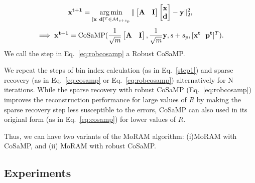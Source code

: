 $$
\mathbf{{x}^{t+1}}=\argmin_{[\mathbf{x~d}]^T \in \mathcal{M}_{s+s_p}}\norm{\begin{bmatrix} \mathbf{A} & \mathbf{I} \end{bmatrix} \begin{bmatrix} \mathbf{x} \\ \mathbf{d} \end{bmatrix} - \mathbf{y}}_2^2, %
$$
\begin{equation}
\implies \mathbf{{x^{t+1}}} = \mathrm{CoSaMP}(\frac{1}{\sqrt{m}}\begin{bmatrix} \mathbf{A} & \mathbf{I} \end{bmatrix},\frac{1}{\sqrt{m}}\mathbf{y},s+s_p,[\mathbf{x^t~~p^t}]^T).
\label{eq:robcosamp}
\end{equation}
We call the step in Eq.~\ref{eq:robcosamp} a Robust CoSaMP. 

We repeat the steps of bin index calculation (as in Eq.~\ref{step1}) and sparse recovery (as in Eq.~\ref{eq:cosamp} or Eq.~\ref{eq:robcosamp}) alternatively for $\mathrm{N}$ iterations. While the sparse recovery with robust CoSaMP (Eq.~\ref{eq:robcosamp}) improves the reconstruction performance for large values of $R$ by making the sparse recovery step less susceptible to the errors, CoSaMP can also used in its original form (as in Eq.~\ref{eq:cosamp}) for lower values of $R$.

Thus, we can have two variants of the MoRAM algorithm: (i)MoRAM with CoSaMP, and (ii) MoRAM with robust CoSaMP. 


%


\subsection{Experiments}


